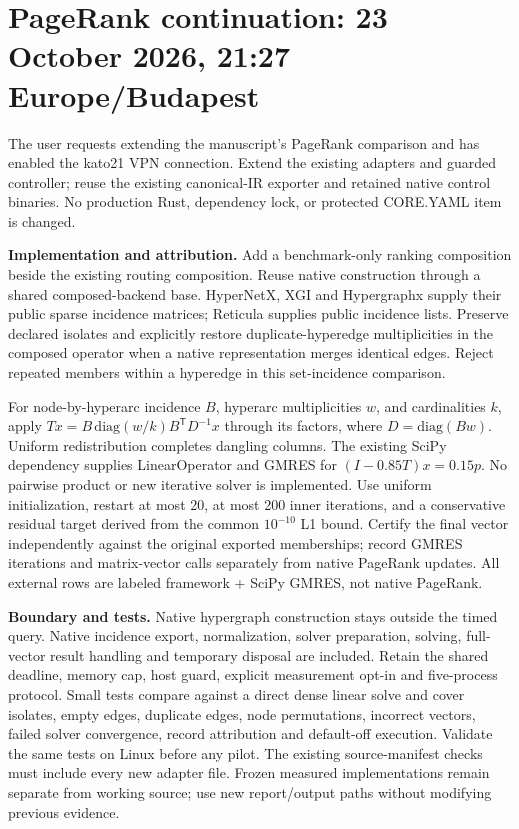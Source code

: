 \documentclass[10pt,a4paper]{article}
\begin{document}
\section*{PageRank continuation: 23 October 2026, 21:27 Europe/Budapest}
The user requests extending the manuscript's PageRank comparison and has enabled
the kato21 VPN connection. Extend the existing adapters and guarded controller;
reuse the existing canonical-IR exporter and retained native control binaries.
No production Rust, dependency lock, or protected CORE.YAML item is changed.

\textbf{Implementation and attribution.} Add a benchmark-only ranking composition
beside the existing routing composition. Reuse native construction through a shared
composed-backend base. HyperNetX, XGI and Hypergraphx supply their public sparse
incidence matrices; Reticula supplies public incidence lists. Preserve declared
isolates and explicitly restore duplicate-hyperedge multiplicities in the composed
operator when a native representation merges identical edges. Reject repeated
members within a hyperedge in this set-incidence comparison.

For node-by-hyperarc incidence $B$, hyperarc multiplicities $w$, and cardinalities
$k$, apply $T x = B\,\mathrm{diag}(w/k)B^{\mathsf T}D^{-1}x$ through its factors,
where $D=\mathrm{diag}(Bw)$. Uniform redistribution completes dangling columns.
The existing SciPy dependency supplies LinearOperator and GMRES for
$(I-0.85T)x=0.15p$. No pairwise product or new iterative solver is implemented.
Use uniform initialization, restart at most 20, at most 200 inner iterations,
and a conservative residual target derived from the common $10^{-10}$ L1 bound.
Certify the final vector independently against the original exported memberships;
record GMRES iterations and matrix-vector calls separately from native PageRank
updates. All external rows are labeled framework + SciPy GMRES, not native PageRank.

\textbf{Boundary and tests.} Native hypergraph construction stays outside the
timed query. Native incidence export, normalization, solver preparation, solving,
full-vector result handling and temporary disposal are included. Retain the shared
deadline, memory cap, host guard, explicit measurement opt-in and five-process
protocol. Small tests compare against a direct dense linear solve and cover isolates,
empty edges, duplicate edges, node permutations, incorrect vectors, failed solver
convergence, record attribution and default-off execution. Validate the same tests
on Linux before any pilot. The existing source-manifest checks must include every
new adapter file. Frozen measured implementations remain separate from working
source; use new report/output paths without modifying previous evidence.
\end{document}
